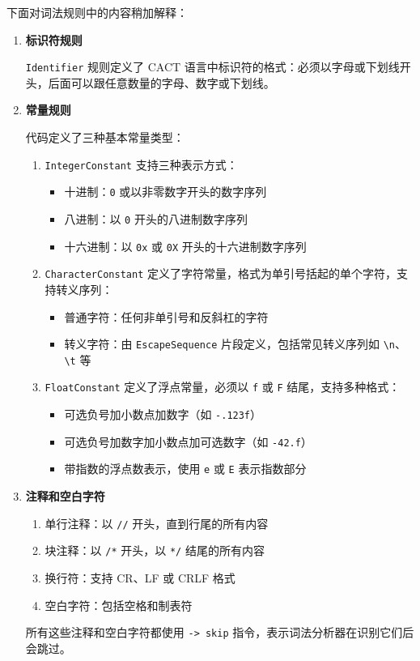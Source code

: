 \documentclass[UTF8]{report}
\begin{document}
下面对词法规则中的内容稍加解释：

\begin{enumerate}
    \item \textbf{标识符规则}
    
    \texttt{Identifier} 规则定义了 CACT 语言中标识符的格式：必须以字母或下划线开头，后面可以跟任意数量的字母、数字或下划线。
    
    \item \textbf{常量规则}
    
    代码定义了三种基本常量类型：
    \begin{enumerate}
        \item \texttt{IntegerConstant} 支持三种表示方式：
        \begin{itemize}
            \item 十进制：\texttt{0} 或以非零数字开头的数字序列
            \item 八进制：以 \texttt{0} 开头的八进制数字序列
            \item 十六进制：以 \texttt{0x} 或 \texttt{0X} 开头的十六进制数字序列
        \end{itemize}
        
        \item \texttt{CharacterConstant} 定义了字符常量，格式为单引号括起的单个字符，支持转义序列：
        \begin{itemize}
            \item 普通字符：任何非单引号和反斜杠的字符
            \item 转义字符：由 \texttt{EscapeSequence} 片段定义，包括常见转义序列如 \texttt{\textbackslash n}、\texttt{\textbackslash t} 等
        \end{itemize}
        
        \item \texttt{FloatConstant} 定义了浮点常量，必须以 \texttt{f} 或 \texttt{F} 结尾，支持多种格式：
        \begin{itemize}
            \item 可选负号加小数点加数字（如 \texttt{-.123f}）
            \item 可选负号加数字加小数点加可选数字（如 \texttt{-42.f}）
            \item 带指数的浮点数表示，使用 \texttt{e} 或 \texttt{E} 表示指数部分
        \end{itemize}
    \end{enumerate}
    
    \item \textbf{注释和空白字符}
    \begin{enumerate}
        \item 单行注释：以 \texttt{//} 开头，直到行尾的所有内容
        \item 块注释：以 \texttt{/*} 开头，以 \texttt{*/} 结尾的所有内容
        \item 换行符：支持 CR、LF 或 CRLF 格式
        \item 空白字符：包括空格和制表符
    \end{enumerate}
    
    所有这些注释和空白字符都使用 \texttt{-> skip} 指令，表示词法分析器在识别它们后会跳过。
\end{enumerate}
\end{document}
